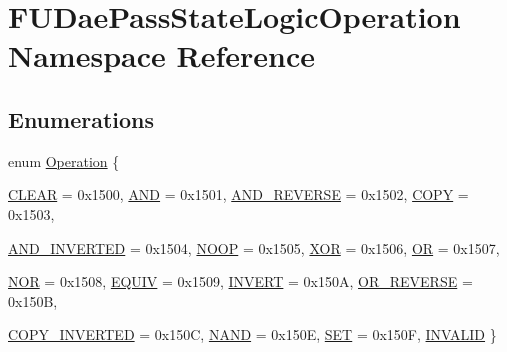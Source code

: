 \hypertarget{namespaceFUDaePassStateLogicOperation}{
\section{FUDaePassStateLogicOperation Namespace Reference}
\label{namespaceFUDaePassStateLogicOperation}
}
\subsection*{Enumerations}
\begin{DoxyCompactItemize}
\item 
enum \hyperlink{namespaceFUDaePassStateLogicOperation_aabe5119ffa94a96a4936012f067b7ff4}{Operation} \{ \par
\hyperlink{namespaceFUDaePassStateLogicOperation_aabe5119ffa94a96a4936012f067b7ff4a57fe51ba8e46d1af947e49125c86d6ba}{CLEAR} =  0x1500, 
\hyperlink{namespaceFUDaePassStateLogicOperation_aabe5119ffa94a96a4936012f067b7ff4ae6a18101026e543b0f0c1e9c61f1a8dc}{AND} =  0x1501, 
\hyperlink{namespaceFUDaePassStateLogicOperation_aabe5119ffa94a96a4936012f067b7ff4af0e926d1bd54a09b3babd232b4e3ac6a}{AND\_\-REVERSE} =  0x1502, 
\hyperlink{namespaceFUDaePassStateLogicOperation_aabe5119ffa94a96a4936012f067b7ff4a3a74b05e051f5c3da778a827a9b50d09}{COPY} =  0x1503, 
\par
\hyperlink{namespaceFUDaePassStateLogicOperation_aabe5119ffa94a96a4936012f067b7ff4af5ce2a336afa8ae50d89bb99cea0c786}{AND\_\-INVERTED} =  0x1504, 
\hyperlink{namespaceFUDaePassStateLogicOperation_aabe5119ffa94a96a4936012f067b7ff4acc120163cde252866be81482a8c5d1ac}{NOOP} =  0x1505, 
\hyperlink{namespaceFUDaePassStateLogicOperation_aabe5119ffa94a96a4936012f067b7ff4a144296c6ba8144d626a322557d2a339d}{XOR} =  0x1506, 
\hyperlink{namespaceFUDaePassStateLogicOperation_aabe5119ffa94a96a4936012f067b7ff4a182f873c530c3731d1a9c781a0c5b5c5}{OR} =  0x1507, 
\par
\hyperlink{namespaceFUDaePassStateLogicOperation_aabe5119ffa94a96a4936012f067b7ff4a11c91d79a1ad252f9017399f7dc3fc95}{NOR} =  0x1508, 
\hyperlink{namespaceFUDaePassStateLogicOperation_aabe5119ffa94a96a4936012f067b7ff4aa5d735418457d2b56b7eb3c443fbaf76}{EQUIV} =  0x1509, 
\hyperlink{namespaceFUDaePassStateLogicOperation_aabe5119ffa94a96a4936012f067b7ff4a3de8f09338b7ce45586049881542febf}{INVERT} =  0x150A, 
\hyperlink{namespaceFUDaePassStateLogicOperation_aabe5119ffa94a96a4936012f067b7ff4a975382aa53d085281e8d993332696e27}{OR\_\-REVERSE} =  0x150B, 
\par
\hyperlink{namespaceFUDaePassStateLogicOperation_aabe5119ffa94a96a4936012f067b7ff4a89827664ab4b018f0014339ae0b250e1}{COPY\_\-INVERTED} =  0x150C, 
\hyperlink{namespaceFUDaePassStateLogicOperation_aabe5119ffa94a96a4936012f067b7ff4ad08291c1608309750aea3b424d8a203d}{NAND} =  0x150E, 
\hyperlink{namespaceFUDaePassStateLogicOperation_aabe5119ffa94a96a4936012f067b7ff4a44d463b189efb43ee17ccf3cc8557f9d}{SET} =  0x150F, 
\hyperlink{namespaceFUDaePassStateLogicOperation_aabe5119ffa94a96a4936012f067b7ff4a7b5dcfd2d11bff19a034cbf299a37f34}{INVALID}
 \}
\end{DoxyCompactItemize}
